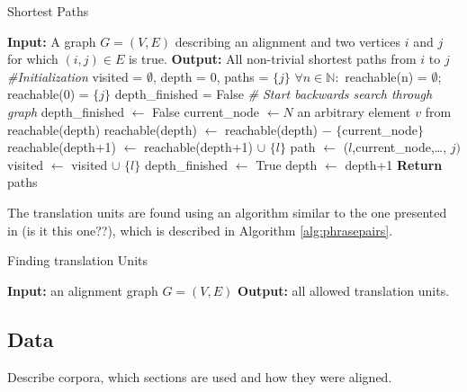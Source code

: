 \documentclass[a4paper, 11pt]{report}
\theoremstyle{definition}
\theoremstyle{plain}
\begin{document}
\begin{algorithm}
\caption{Shortest Paths}\label{alg:shortest paths}
\begin{algorithmic}
\STATE \textbf{Input:} A graph $G = (V,E)$ describing an alignment and two vertices $i$ and $j$ for which $(i,j)\in E$ is true.
\STATE \textbf{Output:} All non-trivial shortest paths from $i$ to $j$
\STATE \textit{\#Initialization}
\STATE visited = $\emptyset$, depth = $0$, paths = $\{j\}$
\STATE $\forall n\in\mathbb{N}:$ reachable(n) = $\emptyset$; reachable($0$) = $\{j\}$
\STATE depth\_finished = False
\STATE \textit{\# Start backwards search through graph}
		\STATE depth\_finished $\leftarrow$ False
		\STATE current\_node $\leftarrow N$ an arbitrary element $v$ from reachable(depth)
		\STATE reachable(depth) $\leftarrow$ reachable(depth) $-$ $\{$current\_node$\}$
				\STATE reachable(depth+1) $\leftarrow$ reachable(depth+1) $\cup$ $\{l\}$
					\STATE path $\leftarrow$ ($l$,current\_node,\ldots, $j)$
				\ENDFOR
			\ENDIF
		\STATE visited $\leftarrow$ visited $\cup$ $\{l\}$
		\ENDFOR
	\STATE depth\_finished $\leftarrow$ True
	\STATE depth $\leftarrow$ depth+1
	\ENDWHILE
\ENDWHILE
\STATE \textbf{Return} paths
\end{algorithmic}
\end{algorithm}

The translation units are found using an algorithm similar to the one presented in \cite{chiang2005hierarchical} (is it this one??), which is described in Algorithm \ref{alg:phrasepairs}.

\begin{algorithm}
\caption{Finding translation Units}\label{alg:phrasepairs}
\begin{algorithmic}
\STATE \textbf{Input:} an alignment graph $G = (V,E)$
\STATE \textbf{Output:} all allowed translation units.
\end{algorithmic}
\end{algorithm}


\subsection{Data}

Describe corpora, which sections are used and how they were aligned.
\end{document}

